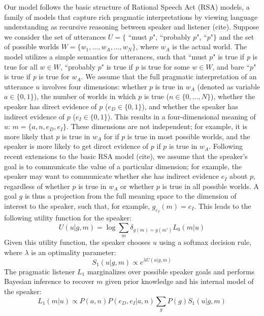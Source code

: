 \documentclass[12pt]{article}
\begin{document}
Our model follows the basic structure of Rational Speech Act (RSA) models, a family of models that capture rich pragmatic interpretations by viewing language understanding as recursive reasoning between speaker and listener (cite). Suppose we consider the set of utterances $U = \{$ ``must $p$", ``probably $p$", ``$p$"$\}$ and the set of possible worlds $W = \{w_1, \dots, w_A, \dots, w_N\}$, where $w_A$ is the actual world. The model utilizes a simple semantics for utterances, such that ``must $p$" is true if \emph{p} is true for all $w \in W$, ``probably $p$" is true if \emph{p} is true for some $w \in W$, and bare ``$p$" is true if \emph{p} is true for $w_A$.  We assume that the full pragmatic interpretation of an utterance $u$ involves four dimensions: whether $p$ is true in $w_A$ (denoted as variable $a \in \{0, 1\}$), the number of worlds in which $p$ is true ($n \in \{0, \dots, N\} $), whether the speaker has direct evidence of $p$ ($e_D \in \{0, 1\}$), and whether the speaker has indirect evidence of $p$ ($e_I \in \{0, 1\}$). This results in a four-dimensional meaning of $u$: $m = \{a, n, e_D, e_I\}$. These dimensions are not independent; for example, it is more likely that $p$ is true in $w_A$ for if $p$ is true in most possible worlds, and the speaker is more likely to get direct evidence of $p$ if $p$ is true in $w_A.$ Following recent extensions to the basic RSA model (cite), we assume that the speaker's goal is to communicate the value of a particular dimension; for example, the speaker may want to communicate whether she has indirect evidence $e_I$ about $p$, regardless of whether $p$ is true in $w_A$ or whether $p$ is true in all possible worlds. A goal $g$ is thus a projection from the full meaning space to the dimension of interest to the speaker, such that, for example, $g_{e_I}(m) =e_I$. This leads to the following utility function for the speaker:
\begin{equation}
U(u | g, m) = \log \sum_{m} \delta_{g(m)=g(m')} L_0(m |u)
\end{equation}
Given this utility function, the speaker chooses $u$ using a softmax decision rule, where $\lambda$ is an optimality parameter:
\begin{equation}
S_1(u | g, m) \propto e^{\lambda U(u | g, m)}
\end{equation}
The pragmatic listener $L_1$ marginalizes over possible speaker goals and performs Bayesian inference to recover $m$ given prior knowledge and his internal model of the speaker:
$$
L_1 (m | u) \propto P(a, n) P(e_D, e_I | a, n) \sum_{g}{P (g) S_1 (u|g, m)}
$$
\end{document}
